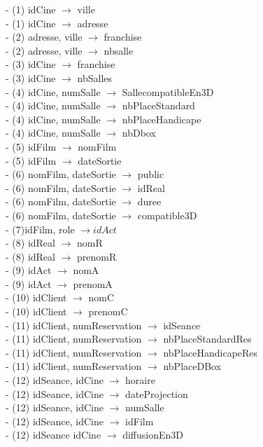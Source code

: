 \documentclass[a4paper,sffamily,12pt]{article}
\begin{document}
						\noindent- (1) idCine $\rightarrow$ ville \\
						- (1) idCine $\rightarrow$ adresse \\
						- (2) adresse, ville $\rightarrow$ franchise \\
						- (2) adresse, ville $\rightarrow$ nbsalle \\
						- (3) idCine $\rightarrow$ franchise \\
						- (3) idCine $\rightarrow$ nbSalles \\
						- (4) idCine, numSalle $\rightarrow$ SallecompatibleEn3D \\
				 		- (4) idCine, numSalle $\rightarrow$ nbPlaceStandard \\
				 		- (4) idCine, numSalle $\rightarrow$ nbPlaceHandicape \\
				 		- (4) idCine, numSalle $\rightarrow$ nbDbox \\
				 		- (5) idFilm $\rightarrow$ nomFilm \\
				 		- (5) idFilm $\rightarrow$ dateSortie \\				 		
						- (6) nomFilm, dateSortie $\rightarrow$ public \\
						- (6) nomFilm, dateSortie $\rightarrow$ idReal \\
						- (6) nomFilm, dateSortie $\rightarrow$ duree \\
						- (6) nomFilm, dateSortie $\rightarrow$ compatible3D \\
						- (7)idFilm, role $\rightarrow idAct$ \\
						- (8) idReal $\rightarrow$ nomR \\
						- (8) idReal $\rightarrow$ prenomR \\						
						- (9) idAct $\rightarrow$ nomA \\
						- (9) idAct $\rightarrow$ prenomA \\						
						- (10) idClient $\rightarrow$ nomC \\
						- (10) idClient $\rightarrow$ prenomC \\						
						- (11) idClient, numReservation $\rightarrow$ idSeance \\
						- (11) idClient, numReservation $\rightarrow$ nbPlaceStandardRes \\
						- (11) idClient, numReservation $\rightarrow$ nbPlaceHandicapeRes \\
						- (11) idClient, numReservation $\rightarrow$ nbPlaceDBox \\
						- (12) idSeance, idCine $\rightarrow$ horaire \\
						- (12) idSeance, idCine $\rightarrow$ dateProjection \\
						- (12) idSeance, idCine $\rightarrow$ numSalle \\
						- (12) idSeance, idCine $\rightarrow$ idFilm \\
						- (12) idSeance  idCine $\rightarrow$ diffusionEn3D \\
										
\end{document}
